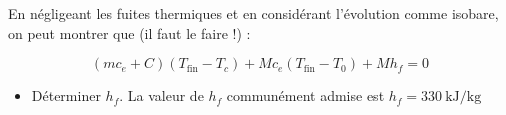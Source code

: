 \documentclass{tp}
\begin{document}
En négligeant les fuites thermiques et en considérant l'évolution comme isobare, on peut montrer que (il faut le faire !) :

\begin{equation}
  (mc_e+C)(T_\text{fin}-T_c) + Mc_e(T_\text{fin}-T_0) + Mh_f = 0
\end{equation}

\begin{itemize}
  \item Déterminer $h_f$. La valeur de $h_f$ communément admise est $h_f = \SI{330}{\kilo\joule\per\kg} $ 
\end{itemize}
\end{document}
